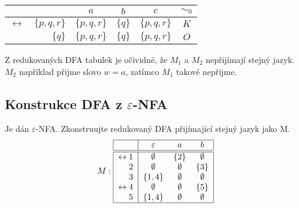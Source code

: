 \begin{multicols}{2}
    \begin{center}
        \begin{tabular}{|r r|c c c|c|}
            \hline
            & $ $ & $ a $ & $ b $ & $ c $ & $\sim_0$\\ \hline \hline
            $ \leftrightarrow $ & $\{p, q, r\}$ & $\{p, q, r\}$ & $\{q\}$ & $\{p, q, r\}$ &$K$ \\
            & $\{q\}$ & $\{p, q, r\}$ & $\{q\}$ & $\{p, q, r\}$ &$O$\\
            \hline
        \end{tabular}
    \end{center}

\columnbreak

\end{multicols}

Z redukovaných DFA tabulek je očividné, že $M_1$ a $M_2$ nepřijímají stejný jazyk. $M_2$ například přijme slovo $w=a$,
zatímco $M_1$ takové nepřijme.


\subsection{Konstrukce DFA z $\varepsilon$-NFA}
Je dán $\varepsilon$-NFA. Zkonstruujte redukovaný DFA přijímající stejný jazyk jako M.
\[
M:
\begin{tabular}{|r|c c c|}
    \hline
    & $\varepsilon$ & $a$ & $b$\\
    \hline
    \hline
    $\leftrightarrow 1$& $\emptyset$ & $\{2\}$& $\emptyset$\\
    $2$                & $\emptyset$ & $\emptyset$& $\{3\}$\\
    $3$                & $\{1,4\}$ & $\emptyset$& $\emptyset$\\
    $\leftrightarrow 4$& $\emptyset$ & $\emptyset$& $\{5\}$\\
    $5$                & $\{1,4\}$ & $\emptyset$& $\emptyset$\\
    \hline
\end{tabular}
\]

